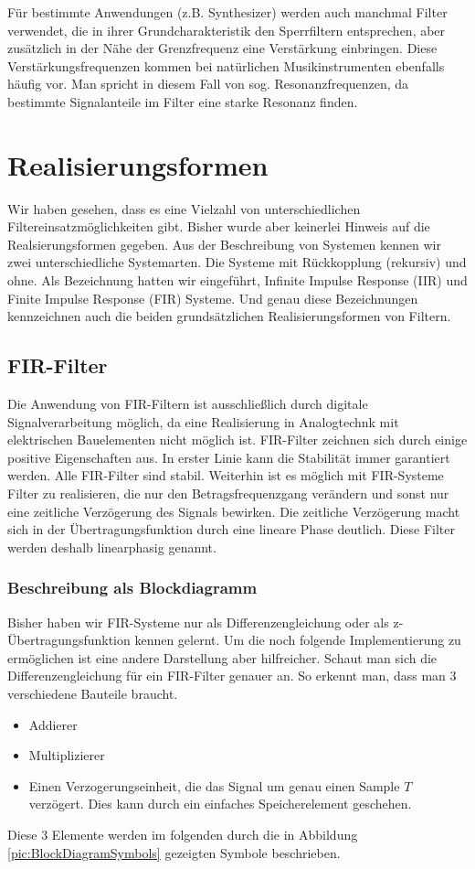 Für bestimmte Anwendungen (z.B. Synthesizer) werden auch manchmal
Filter verwendet, die in ihrer Grundcharakteristik den
Sperrfiltern entsprechen, aber zusätzlich in der Nähe der
Grenzfrequenz eine Verstärkung einbringen. Diese
Verstärkungsfrequenzen kommen bei natürlichen Musikinstrumenten
ebenfalls häufig vor. Man spricht in diesem Fall von sog.
Resonanzfrequenzen, da bestimmte Signalanteile im Filter eine
starke Resonanz finden.

\section{Realisierungsformen}
Wir haben gesehen, dass es eine Vielzahl von unterschiedlichen
Filtereinsatzmöglichkeiten gibt. Bisher wurde aber keinerlei
Hinweis auf die Realsierungsformen gegeben. Aus der Beschreibung
von Systemen kennen wir zwei unterschiedliche Systemarten. Die
Systeme mit Rückkopplung (rekursiv) und ohne. Als Bezeichnung
hatten wir eingeführt, Infinite Impulse Response (IIR) und Finite
Impulse Response (FIR) Systeme. Und genau diese Bezeichnungen
kennzeichnen auch die beiden grundsätzlichen Realisierungsformen
von Filtern.

\subsection{FIR-Filter}
Die Anwendung von FIR-Filtern ist ausschließlich durch digitale
Signalverarbeitung möglich, da eine Realisierung in Analogtechnk
mit elektrischen Bauelementen nicht möglich ist. FIR-Filter
zeichnen sich durch einige positive Eigenschaften aus. In erster
Linie kann die Stabilität immer garantiert werden. Alle FIR-Filter
sind stabil. Weiterhin ist es möglich mit FIR-Systeme Filter zu
realisieren, die nur den Betragsfrequenzgang verändern und sonst
nur eine zeitliche Verzögerung des Signals bewirken. Die zeitliche
Verzögerung macht sich in der Übertragungsfunktion durch eine
lineare Phase deutlich. Diese Filter werden deshalb linearphasig
genannt.

\subsubsection{Beschreibung als Blockdiagramm}
Bisher haben wir FIR-Systeme nur als Differenzengleichung
oder als
z-Übertragungsfunktion kennen gelernt. Um die noch folgende
Implementierung zu ermöglichen ist eine andere Darstellung aber
hilfreicher. Schaut man sich die Differenzengleichung für ein
FIR-Filter genauer an. So erkennt man, dass man 3 verschiedene
Bauteile braucht.
\begin{itemize}
    \item Addierer
    \item Multiplizierer
    \item Einen Verzogerungseinheit, die das Signal um genau einen
    Sample $T$ verzögert. Dies kann durch ein einfaches
    Speicherelement geschehen.
\end{itemize}
Diese 3 Elemente werden im folgenden durch die in Abbildung
\ref{pic:BlockDiagramSymbols} gezeigten Symbole beschrieben.

